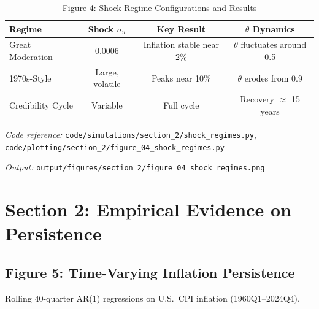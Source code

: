 \documentclass[11pt]{article}
\begin{document}
\begin{table}[htbp]
\centering
\caption{Figure 4: Shock Regime Configurations and Results}
\label{tab:shock_regimes}
\begin{threeparttable}
\begin{tabular}{lccc}
\toprule
Regime & Shock $\sigma_u$ & Key Result & $\theta$ Dynamics \\
\midrule
Great Moderation & 0.0006 & Inflation stable near 2\% & $\theta$ fluctuates around 0.5 \\
1970s-Style & Large, volatile & Peaks near 10\% & $\theta$ erodes from 0.9 \\
Credibility Cycle & Variable & Full cycle & Recovery $\approx$ 15 years \\
\bottomrule
\end{tabular}
\begin{tablenotes}
\small
\item \textit{Code reference:} \texttt{code/simulations/section\_2/shock\_regimes.py}, \texttt{code/plotting/section\_2/figure\_04\_shock\_regimes.py}
\item \textit{Output:} \texttt{output/figures/section\_2/figure\_04\_shock\_regimes.png}
\end{tablenotes}
\end{threeparttable}
\end{table}

\section{Section 2: Empirical Evidence on Persistence}
\label{sec:persistence}

\subsection{Figure 5: Time-Varying Inflation Persistence}

Rolling 40-quarter AR(1) regressions on U.S.\ CPI inflation (1960Q1--2024Q4).
\end{document}
